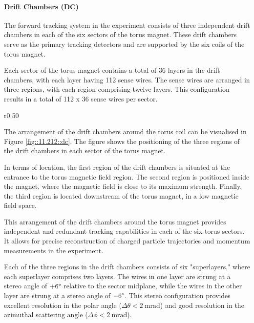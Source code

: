 \paragraph{Drift Chambers (DC)}
    The forward tracking system in the experiment consists of three independent drift chambers in each of the six sectors of the torus magnet.
    These drift chambers serve as the primary tracking detectors and are supported by the six coils of the torus magnet.

    Each sector of the torus magnet contains a total of 36 layers in the drift chambers, with each layer having 112 sense wires.
    The sense wires are arranged in three regions, with each region comprising twelve layers.
    This configuration results in a total of 112 x 36 sense wires per sector.

    \begin{wrapfigure}{r}{0.50\textwidth}
        \caption[DC]
        {Drift Chambers (DC) render.
        Each of the DC regions are denoted as R1, R2, and R3 in the figure.}
        \label{fig::11.212::dc}
    \end{wrapfigure}

    The arrangement of the drift chambers around the torus coil can be visualised in Figure \ref{fig::11.212::dc}.
    The figure shows the positioning of the three regions of the drift chambers in each sector of the torus magnet.

    In terms of location, the first region of the drift chambers is situated at the entrance to the torus magnetic field region.
    The second region is positioned inside the magnet, where the magnetic field is close to its maximum strength.
    Finally, the third region is located downstream of the torus magnet, in a low magnetic field space.

    This arrangement of the drift chambers around the torus magnet provides independent and redundant tracking capabilities in each of the six torus sectors.
    It allows for precise reconstruction of charged particle trajectories and momentum measurements in the experiment.

    Each of the three regions in the drift chambers consists of six "superlayers," where each superlayer comprises two layers.
    The wires in one layer are strung at a stereo angle of $+6\degree$ relative to the sector midplane, while the wires in the other layer are strung at a stereo angle of $-6\degree$.
    This stereo configuration provides excellent resolution in the polar angle ($\Delta\theta < 2 ~\text{mrad}$) and good resolution in the azimuthal scattering angle ($\Delta\phi < 2 ~\text{mrad}$).

